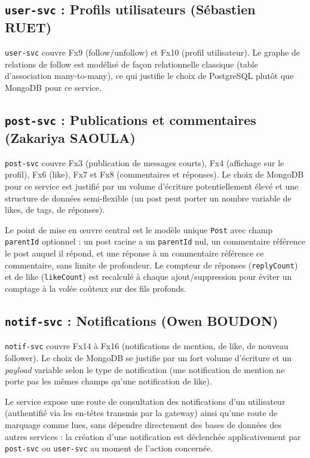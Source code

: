 \documentclass{cesi}
\begin{document}
\subsection{\texttt{user-svc} : Profils utilisateurs (Sébastien RUET)}

\texttt{user-svc} couvre Fx9 (follow/unfollow) et Fx10 (profil utilisateur). Le
graphe de relations de follow est modélisé de façon relationnelle classique
(table d'association many-to-many), ce qui justifie le choix de PostgreSQL plutôt
que MongoDB pour ce service.

\subsection{\texttt{post-svc} : Publications et commentaires (Zakariya SAOULA)}

\texttt{post-svc} couvre Fx3 (publication de messages courts), Fx4 (affichage sur le
profil), Fx6 (like), Fx7 et Fx8 (commentaires et réponses). Le choix de MongoDB
pour ce service est justifié par un volume d'écriture potentiellement élevé et une
structure de données semi-flexible (un post peut porter un nombre variable de
likes, de tags, de réponses).

Le point de mise en œuvre central est le modèle unique \texttt{Post} avec champ
\texttt{parentId} optionnel : un post racine a un \texttt{parentId} nul, un
commentaire référence le post auquel il répond, et une réponse à un commentaire
référence ce commentaire, sans limite de profondeur. Le compteur de réponses
(\texttt{replyCount}) et de like (\texttt{likeCount}) est recalculé à chaque ajout/suppression
pour éviter un comptage à la volée coûteux sur des fils profonds.

\subsection{\texttt{notif-svc} : Notifications (Owen BOUDON)}

\texttt{notif-svc} couvre Fx14 à Fx16 (notifications de mention, de like, de nouveau
follower). Le choix de MongoDB se justifie par un fort volume d'écriture et un
\emph{payload} variable selon le type de notification (une notification de mention
ne porte pas les mêmes champs qu'une notification de like).

Le service expose une route de consultation des notifications d'un utilisateur
(authentifié via les en-têtes transmis par la gateway) ainsi qu'une route de
marquage comme lues, sans dépendre directement des bases de données des autres
services : la création d'une notification est déclenchée applicativement par
\texttt{post-svc} ou \texttt{user-svc} au moment de l'action concernée.
\end{document}
